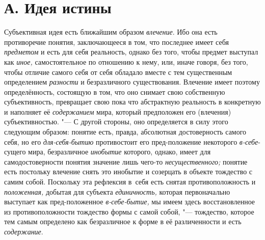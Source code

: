 \section[А. Идея истины]{А. Идея истины}

Субъективная идея есть ближайшим образом {\em влечение}. Ибо она
есть противоречие понятия, заключающееся в том, что последнее имеет себя
{\em предметом} и есть
для себя реальность, однако без того, чтобы предмет выступал как {\em иное,}
самостоятельное по отношению к нему, или, иначе говоря, без
того, чтобы отличие самого себя от себя обладало вместе с тем существенным
определением {\em разности} и безразличного существования. Влечение имеет
поэтому определённость, состоящую в том, что оно снимает свою собственную
субъективность, превращает свою пока что абстрактную реальность
в конкретную и наполняет её {\em содержанием} мира,
который предположен его (влечения) субъективностью. "--- С другой
стороны, оно определяется в силу этого следующим образом: понятие
есть, правда, абсолютная достоверность самого себя, но его
{\em для-себя-бытию} противостоит его пред-положение некоторого
{\em в-себе}-сущего мира, безразличное {\em инобытие}
которого, однако, имеет для самодостоверности понятия
значение лишь чего-то {\em несущественного;}
понятие есть постольку влечение снять это инобытие и
созерцать в объекте тождество с самим собой. Поскольку эта рефлексия в~себя
есть снятая противоположность и {\em положенная,} добытая
для субъекта {\em единичность,} которая первоначально выступает как
пред-положенное {\em в-себе-бытие,} мы
имеем здесь восстановленное из противоположности тождество формы с самой
собой, "--- тождество, которое тем самым
определено как безразличное к форме в её различенности и
есть {\em содержание}.

